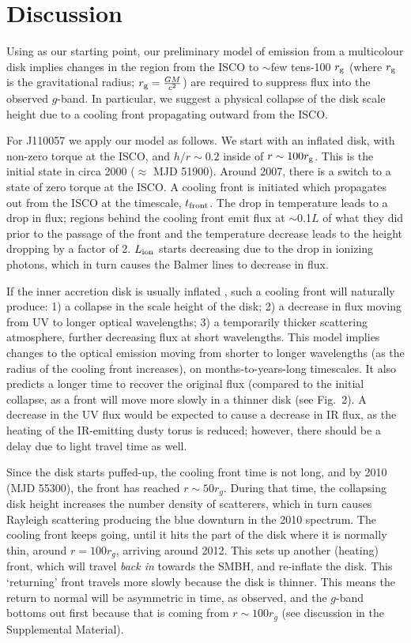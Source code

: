 \documentclass{nature}
\begin{document}
\section{Discussion}   
Using \cite{Sirko_Goodman2003} as our starting point, our preliminary
model \citep{Ford2018} of emission from a multicolour disk implies
changes in the region from the ISCO to $\sim$few tens-100 $r_{\rm g}$
(where $r_{\rm g}$ is the gravitational radius; $r_{\rm
g}=\frac{GM}{c^2}$) are required to suppress flux into the observed
$g$-band. In particular, we suggest a physical collapse of the disk
scale height due to a cooling front propagating outward from the ISCO.

For J110057 we apply our model as follows. We start with an inflated
disk, with non-zero torque at the ISCO, and $h/r\sim0.2$ inside of
$r\sim100 r_{\rm g}$.  This is the initial state in circa 2000
($\approx$ MJD 51900).  Around 2007, there is a switch to a state of
zero torque at the ISCO. A cooling front is initiated which propagates
out from the ISCO at the timescale, $t_{\rm front}$. The drop in temperature 
leads to a drop in flux; regions behind
the cooling front emit flux at $\sim$0.1$L$ of what they did prior to the
passage of the front and the temperature decrease leads to the height 
dropping by a factor of 2.  $L_{\rm ion}$ starts decreasing due to the
drop in ionizing photons, which in turn causes the Balmer lines to 
decrease in flux.

If the inner accretion disk is usually inflated
\cite[see e.g., ][]{Sirko_Goodman2003, Thompson2005,
Hopkins_Quataert2011}, such a cooling front will naturally produce: 1)
a collapse in the scale height of the disk; 2) a decrease in flux
moving from UV to longer optical wavelengths; 3) a temporarily thicker
scattering atmosphere, further decreasing flux at short wavelengths.
This model implies changes to the optical emission moving from shorter
to longer wavelengths (as the radius of the cooling front increases),
on months-to-years-long timescales. It also predicts a longer time to
recover the original flux (compared to the initial collapse, as a
front will move more slowly in a thinner disk (see Fig.~2). A decrease
in the UV flux would be expected to cause a decrease in IR flux,
as the heating of the IR-emitting dusty torus is reduced; however,
there should be a delay due to light travel time as well. 

Since the disk starts puffed-up, the cooling front time is not long,
and by 2010 (MJD 55300), the front has reached $r\sim50 r_{g}$. During
that time, the collapsing disk height increases the number density of
scatterers, which in turn causes Rayleigh scattering producing the
blue downturn in the 2010 spectrum.  The cooling front keeps going,
until it hits the part of the disk where it is normally thin, around
$r=100 r_g$, arriving around 2012. This sets up another (heating)
front, which will travel {\it back in} towards the SMBH, and
re-inflate the disk. This `returning' front travels more slowly
because the disk is thinner. This means the return to normal will be
asymmetric in time, as observed, and the $g$-band bottoms out first
because that is coming from $r\sim100r_{g}$ (see discussion in the
Supplemental Material).
\end{document}
